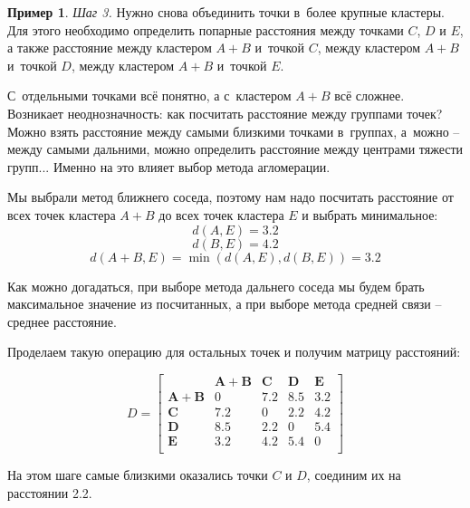 \documentclass[12pt,a4paper]{article}
\theoremstyle{definition}
\newtheorem{example}{Пример}
\begin{document}
\begin{example}
\textit{Шаг 3.} Нужно снова объединить точки в~более крупные кластеры. Для этого 
необходимо определить попарные расстояния между точками 
$C$, $D$ и $E$, а также расстояние между кластером $A+B$ и~точкой $C$, 
между кластером $A+B$ и~точкой $D$, между кластером $A+B$ и~точкой $E$.

С~отдельными точками всё понятно, а с~кластером $A+B$ всё сложнее. 
Возникает неоднозначность: как посчитать расстояние 
между группами точек? Можно взять расстояние между самыми близкими 
точками в~группах, а~можно – между самыми дальними, можно определить 
расстояние между центрами тяжести групп... Именно на это влияет выбор 
метода агломерации.

Мы выбрали метод ближнего соседа, поэтому нам надо 
посчитать расстояние от всех точек кластера $A+B$ до всех точек кластера 
$E$ и выбрать минимальное: 
$$
d(A, E) = 3.2
$$ 
$$ 
d(B, E) = 4.2
$$ 
$$
d(A+B, E) = \min(d(A, E), d(B, E)) = 3.2
$$

Как можно догадаться, при выборе метода дальнего соседа 
мы будем брать максимальное значение из посчитанных, а при выборе 
метода средней связи – среднее расстояние.

Проделаем такую операцию для остальных точек и получим матрицу 
расстояний:

$$
D = \begin{bmatrix}
& \bm{A+B} & \bm{C} & \bm{D} & \bm{E} \\
\bm{A+B} & 0 & 7.2 & 8.5 & 3.2 \\
\bm{C} & 7.2 & 0 & 2.2 &  4.2\\
\bm{D} & 8.5 & 2.2 & 0 & 5.4\\
\bm{E} & 3.2 & 4.2 & 5.4 & 0\\
\end{bmatrix}
$$

\newpage
На этом шаге самые близкими оказались точки $C$ и $D$, соединим их на 
расстоянии 2.2.

\begin{figure}[ht!]
\centering
{}
\end{figure}
\end{example}
\end{document}
